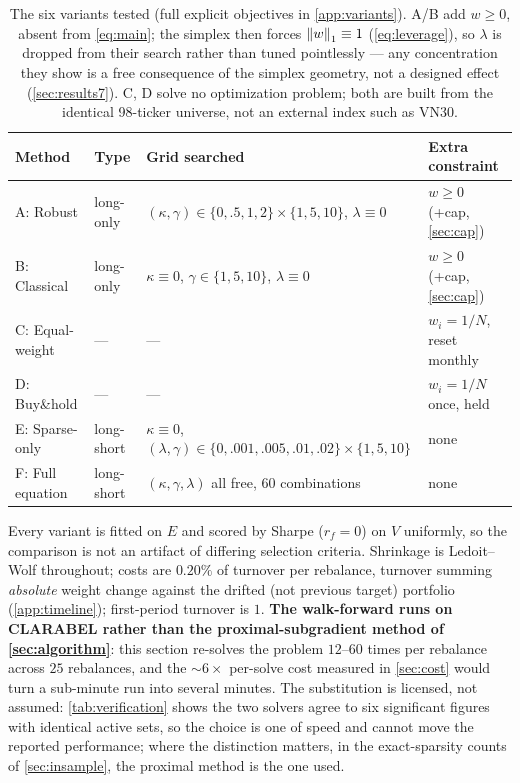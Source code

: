 \begin{table}[htbp]
\centering
\caption{The six variants tested (full explicit objectives in \cref{app:variants}). A/B add
$w\ge0$, absent from \cref{eq:main}; the simplex then forces $\left\lVert w \right\rVert_1\equiv1$
(\cref{eq:leverage}), so $\lambda$ is dropped from their search rather than tuned pointlessly ---
any concentration they show is a free consequence of the simplex geometry, not a designed effect
(\cref{sec:results7}). C, D solve no optimization problem; both are built from the identical
98-ticker universe, not an external index such as VN30.}
\label{tab:variants}
\small
\begin{tabular}{@{}llll@{}}
\toprule
\textbf{Method} & \textbf{Type} & \textbf{Grid searched} & \textbf{Extra constraint} \\
\midrule
A: Robust     & long-only  & $(\kappa,\gamma)\in\{0,.5,1,2\}\times\{1,5,10\}$, $\lambda\equiv0$ & $w\ge0$ (+cap, \cref{sec:cap}) \\
B: Classical  & long-only  & $\kappa\equiv0$, $\gamma\in\{1,5,10\}$, $\lambda\equiv0$ & $w\ge0$ (+cap, \cref{sec:cap}) \\
C: Equal-weight & --- & --- & $w_i=1/N$, reset monthly \\
D: Buy\&hold  & --- & --- & $w_i=1/N$ once, held \\
E: Sparse-only & long-short & $\kappa\equiv0$, $(\lambda,\gamma)\in\{0,.001,.005,.01,.02\}\times\{1,5,10\}$ & none \\
F: Full equation & long-short & $(\kappa,\gamma,\lambda)$ all free, $60$ combinations & none \\
\bottomrule
\end{tabular}
\end{table}

Every variant is fitted on $E$ and scored by Sharpe ($r_f=0$) on $V$ uniformly, so the comparison
is not an artifact of differing selection criteria. Shrinkage is Ledoit--Wolf \citep{ledoit2004}
throughout; costs are $0.20\%$ of turnover per rebalance, turnover summing \emph{absolute} weight
change against the drifted (not previous target) portfolio (\cref{app:timeline}); first-period
turnover is $1$. \textbf{The walk-forward runs on CLARABEL rather than the proximal-subgradient
method of \cref{sec:algorithm}}: this section re-solves the problem $12$--$60$ times per rebalance
across $25$ rebalances, and the $\sim6\times$ per-solve cost measured in \cref{sec:cost} would
turn a sub-minute run into several minutes. The substitution is licensed, not assumed:
\cref{tab:verification} shows the two solvers agree to six significant figures with identical
active sets, so the choice is one of speed and cannot move the reported performance; where the
distinction matters, in the exact-sparsity counts of \cref{sec:insample}, the proximal method is
the one used.

